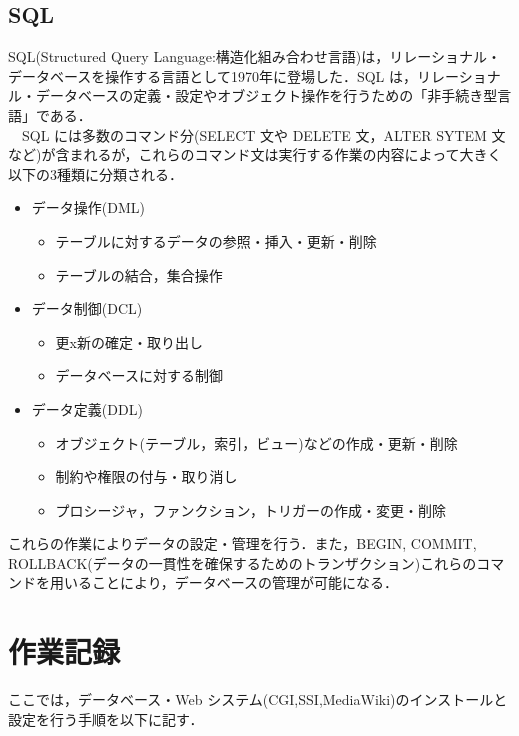 \documentclass[a4j,titlepage]{jarticle}
\begin{document}
%
\subsection{SQL}
SQL(Structured Query Language:構造化組み合わせ言語)は，リレーショナル・データベースを操作する言語として1970年に登場した．SQL は，リレーショナル・データベースの定義・設定やオブジェクト操作を行うための「非手続き型言語」である． \\
　SQL には多数のコマンド分(SELECT 文や DELETE 文，ALTER SYTEM 文など)が含まれるが，これらのコマンド文は実行する作業の内容によって大きく以下の3種類に分類される．\\

\begin{itemize}
\item データ操作(DML)
  \begin{itemize}
  \item テーブルに対するデータの参照・挿入・更新・削除
  \item テーブルの結合，集合操作
\end{itemize}
  
\item データ制御(DCL)
  \begin{itemize}
  \item 更x新の確定・取り出し

  \item データベースに対する制御 

  \end{itemize}

\item データ定義(DDL)
\begin{itemize}
\item オブジェクト(テーブル，索引，ビュー)などの作成・更新・削除

\item 制約や権限の付与・取り消し
 
\item プロシージャ，ファンクション，トリガーの作成・変更・削除
  
\end{itemize}
\end{itemize}

これらの作業によりデータの設定・管理を行う．また，BEGIN, COMMIT, ROLLBACK(データの一貫性を確保するためのトランザクション)これらのコマンドを用いることにより，データベースの管理が可能になる\cite{bib:sql2text}．

\newpage

%
\section{作業記録}
ここでは，データベース・Web システム(CGI,SSI,MediaWiki)のインストールと設定を行う手順を以下に記す．
\end{document}
